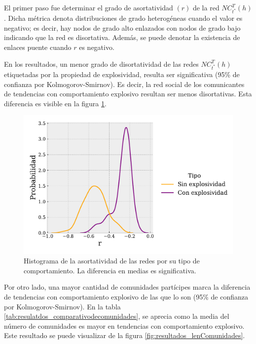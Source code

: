 \documentclass[../main.tex]{subfiles}
\begin{document}
El primer paso fue determinar  el grado de asortatividad $(r)$ de la red $NC_{t^{*}}^{T}(h)$. Dicha métrica denota distribuciones de grado heterogéneas cuando el valor es negativo; es decir, hay nodos de grado alto enlazados con nodos de grado bajo indicando que la red es disortativa. Además, se puede denotar la existencia de enlaces puente cuando $r$ es negativo. 

En los resultados, un menor grado de disortatividad de las redes $NC_{t^{*}}^{T}(h)$ etiquetadas por la propiedad de explosividad, resulta ser significativa (95\% de confianza por Kolmogorov-Smirnov). Es decir, la red social de los comunicantes de tendencias con comportamiento explosivo resultan ser menos disortativas. Esta diferencia es visible en la figura \ref{fig:results_RmaxInteract}. 


\begin{figure}[h!]
    \centering
    \includegraphics[scale = 0.7]{images/results_Rmaxinteract.pdf}
    \caption{Histograma de la asortatividad de las redes por su tipo de comportamiento. La diferencia en medias es significativa.  }
    \label{fig:results_RmaxInteract}
\end{figure}

Por otro lado, una mayor cantidad de comunidades partícipes marca la diferencia de tendencias con comportamiento explosivo de las que  lo son (95\% de confianza por Kolmogorov-Smirnov). En la tabla \ref{tab:resulatdos_comparativodecomunidades}, se aprecia como la media del número de comunidades es mayor en tendencias con comportamiento explosivo. Este resultado se puede visualizar de la figura \ref{fig:resultados_lenComunidades}. %
\end{document}
